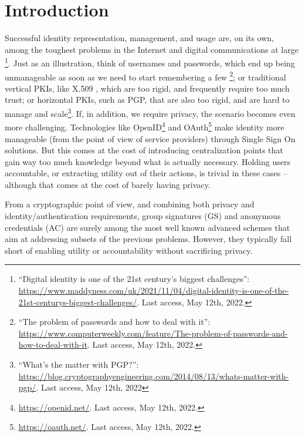 \section{Introduction}
\label{sec:introduction}

Successful identity representation, management, and usage are, on its own, among
the toughest problems in the Internet and digital communications at large%
\footnote{``Digital identity is one of the 21st century's biggest challenges'':
  \href{https://www.maddyness.com/uk/2021/11/04/digital-identity-is-one-of-the-21st-centurys-biggest-challenges/}{https://www.maddyness.com/uk/2021/11/04/digital-identity-is-one-of-the-21st-centurys-biggest-challenges/}. Last access, May 12th, 2022.}.
Just as an illustration, think
of usernames and passwords, which end up being unmanageable as soon as we need
to start remembering a few%
\footnote{``The problem of passwords and how to deal with it'': \url{https://www.computerweekly.com/feature/The-problem-of-passwords-and-how-to-deal-with-it}. Last access,
May 12th, 2022.}; or traditional vertical PKIs, like X.509 \cite{rfc5280},
which are too rigid, and frequently require too much trust; or
horizontal PKIs, such as PGP, that are also too rigid, and are hard to manage
and scale\footnote{``What's the matter with PGP?'': \url{https://blog.cryptographyengineering.com/2014/08/13/whats-matter-with-pgp/}. Last access, May 12th, 2022}.
If, in addition, we require privacy, the scenario becomes even more
challenging. Technologies like OpenID\footnote{\url{https://openid.net/}. Last
  access, May 12th, 2022.} and OAuth\footnote{\url{https://oauth.net/}. Last
  access, May 12th, 2022.} make identity more
manageable (from the point of view of service providers) through Single Sign
On solutions. But this comes at the cost of introducing centralization points
that gain way too much knowledge beyond what is actually necessary. Holding
users accountable, or extracting utility out of their actions, is trivial in
these cases -- although that comes at the cost of barely having privacy.


From a cryptographic point of view, and combining both privacy and
identity/authentication requirements, group signatures (GS) and anonymous
credentials (AC) are surely among the most well known advanced schemes that
aim at addressing subsets of the previous problems. However, they typically fall
short of enabling utility or accountability without sacrificing privacy.

